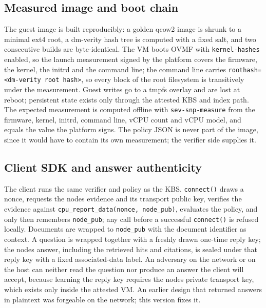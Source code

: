 \documentclass[letterpaper,twocolumn,10pt]{article}
\begin{document}
\subsection{Measured image and boot chain}\label{measured-image-and-boot-chain}

The guest image is built reproducibly: a golden qcow2 image is shrunk to a minimal ext4 root, a dm-verity hash tree is computed with a fixed salt, and two consecutive builds are byte-identical. The VM boots OVMF with \texttt{kernel-hashes} enabled, so the launch measurement signed by the platform covers the firmware, the kernel, the initrd and the command line; the command line carries \texttt{roothash=\textless{}dm-verity\ root\ hash\textgreater{}}, so every block of the root filesystem is transitively under the measurement. Guest writes go to a tmpfs overlay and are lost at reboot; persistent state exists only through the attested KBS and index path. The expected measurement is computed offline with \texttt{sev-snp-measure} \cite{sevsnpmeasure} from the firmware, kernel, initrd, command line, vCPU count and vCPU model, and equals the value the platform signs. The policy JSON is never part of the image, since it would have to contain its own measurement; the verifier side supplies it.

\subsection{Client SDK and answer authenticity}\label{client-sdk-and-answer-authenticity}

The client runs the same verifier and policy as the KBS. \texttt{connect()} draws a nonce, requests the node\textquotesingle s evidence and its transport public key, verifies the evidence against \texttt{cpu\_report\_data(nonce,\ node\_pub)}, evaluates the policy, and only then remembers \texttt{node\_pub}; any call before a successful \texttt{connect()} is refused locally. Documents are wrapped to \texttt{node\_pub} with the document identifier as context. A question is wrapped together with a freshly drawn one-time reply key; the node\textquotesingle s answer, including the retrieved hits and citations, is sealed under that reply key with a fixed associated-data label. An adversary on the network or on the host can neither read the question nor produce an answer the client will accept, because learning the reply key requires the node\textquotesingle s private transport key, which exists only inside the attested VM. An earlier design that returned answers in plaintext was forgeable on the network; this version fixes it.
\end{document}
